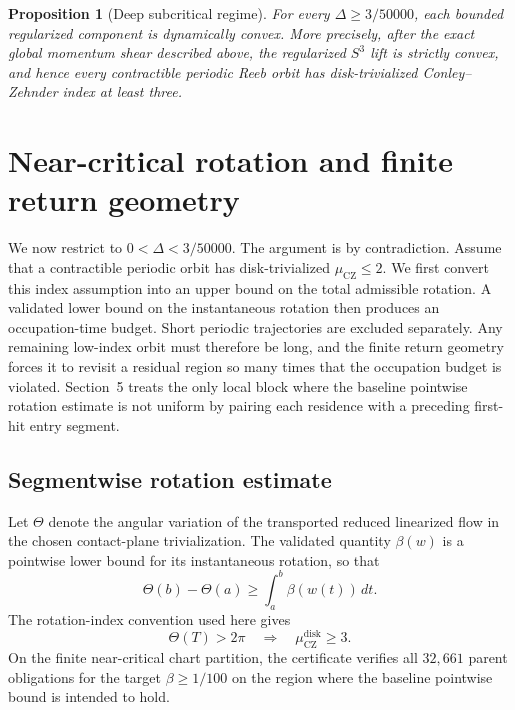 \documentclass[11pt]{article}
\newtheorem{proposition}[theorem]{Proposition}
\newcommand{\CZ}{\mu_{\mathrm{CZ}}}
\begin{document}
\begin{proposition}[Deep subcritical regime]\label{prop:deep}
For every $\Delta\ge3/50000$, each bounded regularized component is dynamically convex. More precisely, after the exact global momentum shear described above, the regularized $S^3$ lift is strictly convex, and hence every contractible periodic Reeb orbit has disk-trivialized Conley--Zehnder index at least three.
\end{proposition}

\section{Near-critical rotation and finite return geometry}
We now restrict to $0<\Delta<3/50000$. The argument is by contradiction. Assume that a contractible periodic orbit has disk-trivialized $\CZ\le2$. We first convert this index assumption into an upper bound on the total admissible rotation. A validated lower bound on the instantaneous rotation then produces an occupation-time budget. Short periodic trajectories are excluded separately. Any remaining low-index orbit must therefore be long, and the finite return geometry forces it to revisit a residual region so many times that the occupation budget is violated. Section~5 treats the only local block where the baseline pointwise rotation estimate is not uniform by pairing each residence with a preceding first-hit entry segment.

\subsection{Segmentwise rotation estimate}
Let $\Theta$ denote the angular variation of the transported reduced linearized flow in the chosen contact-plane trivialization. The validated quantity $\beta(w)$ is a pointwise lower bound for its instantaneous rotation, so that
\[
\Theta(b)-\Theta(a)\ge \int_a^b \beta(w(t))\,dt.
\]
The rotation-index convention used here gives
\[
\Theta(T)>2\pi \quad\Longrightarrow\quad \CZ^{\mathrm{disk}}\ge3.
\]
On the finite near-critical chart partition, the certificate verifies all $32{,}661$ parent obligations for the target $\beta\ge1/100$ on the region where the baseline pointwise bound is intended to hold.
\end{document}
